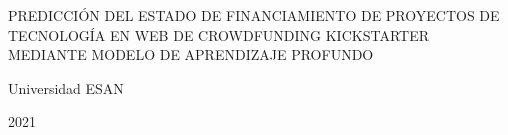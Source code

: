 \begin{center}
	{PREDICCIÓN DEL ESTADO DE FINANCIAMIENTO DE PROYECTOS DE TECNOLOGÍA EN WEB DE CROWDFUNDING KICKSTARTER MEDIANTE MODELO DE APRENDIZAJE PROFUNDO}
\end{center}

\vspace{2.5cm}

\dotfill

\vspace{1.5cm}

\dotfill

\vspace{1.5cm}

\dotfill

\vspace{1.5cm}

\centerline{Universidad ESAN}
\centerline{2021}